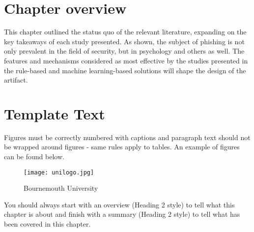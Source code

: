 \section{Chapter overview}
This chapter outlined the status quo of the relevant literature, expanding on
the key takeaways of each study presented. As shown, the subject of phishing is
not only prevalent in the field of security, but in psychology and others as
well. The features and mechanisms considered as most effective by the studies
presented in the rule-based and machine learning-based solutions will shape the
design of the artifact.
















\iffalse
	\section{Template Text}
	Figures must be correctly numbered with captions and paragraph text should not be wrapped around figures - same rules apply to tables. An example of figures can be found below.
	\begin{figure}[t]
		\centering
		\texttt{[image: unilogo.jpg]}
		\caption{Bournemouth University}
		\label{fig:BULogo2}
	\end{figure}
	You should always start with an overview (Heading 2 style) to tell what this chapter is about and finish with a summary (Heading 2 style) to tell what has been covered in this chapter.

